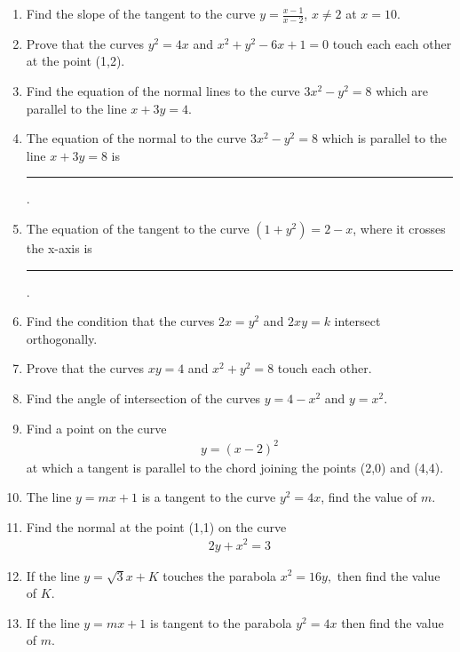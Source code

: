 \begin{enumerate}[label=\thesubsection.\arabic*,ref=\thesubsection.\theenumi]
\item Find the slope of the tangent to the curve $y = \frac{x-1}{x-2}$, $x \neq 2$ at $x=10$.
	\\
\solution 
\label{chapters/12/6/3/2}

\item Prove that the curves $y^2=4x$ and $x^2+y^2-6x+1=0$ touch each each other at the point (1,2).
\item Find the equation of the normal lines to the curve $3x^2-y^2=8$ which are parallel to the line $x+3y=4$.
 \item The equation of the normal to the curve $3x^2-y^2 =8$ which is parallel to the line $x+3y=8$ is
\rule{1cm}{0.1pt}.
\item The equation of the tangent to the curve $(1+y^2) =2-x$, where it crosses the x-axis is 
\rule{1cm}{0.1pt}.
\item Find the condition that the curves $2x=y^2$ and $2xy=k$ intersect orthogonally.
\item Prove that the curves $xy=4$ and $x^2+y^2=8$ touch each other.
\item Find the angle of intersection of the curves $y=4-x^2$ and $y=x^2$.
\item 
		Find a point on the curve \begin{align}y=(x-2)^2\end{align} at which a tangent is parallel to the chord joining the points (2,0) and (4,4).
			\\
			\solution 
\label{chapters/12/6/3/8}

\item 
 The line $y=mx+1$ is a tangent to the curve $y^2 = 4x$, find the value of $m$. 
\item 
\label{chapters/12/6/6/22}
Find the normal at the point (1,1) on the curve 
\begin{align}
2y+x^2=3
\end{align}
 \item If the line $y=\sqrt{3}x+K$ touches the parabola $x^2=16y,$ then find the value of $K$.
\item If the line $y=mx+1$ is tangent to the parabola $y^2=4x$ then find the value of $m$.


\end{enumerate}
